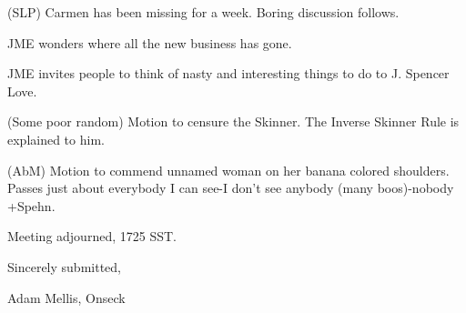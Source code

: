 \documentclass[12pt]{article}
\begin{document}
(SLP) Carmen has been missing for a week. Boring discussion follows.

JME wonders where all the new business has gone.

JME invites people to think of nasty and interesting things to do to J. Spencer Love.

(Some poor random) Motion to censure the Skinner. The Inverse Skinner Rule is explained to him.

(AbM) Motion to commend unnamed woman on her banana colored shoulders. Passes just about everybody I can see-I don't see anybody (many boos)-nobody +Spehn.

\vspace{12pt}

\noindent
Meeting adjourned, 1725 SST.

\vspace{18pt}

\centerline{Sincerely submitted,}
\centerline{Adam Mellis, Onseck}
\end{document}
